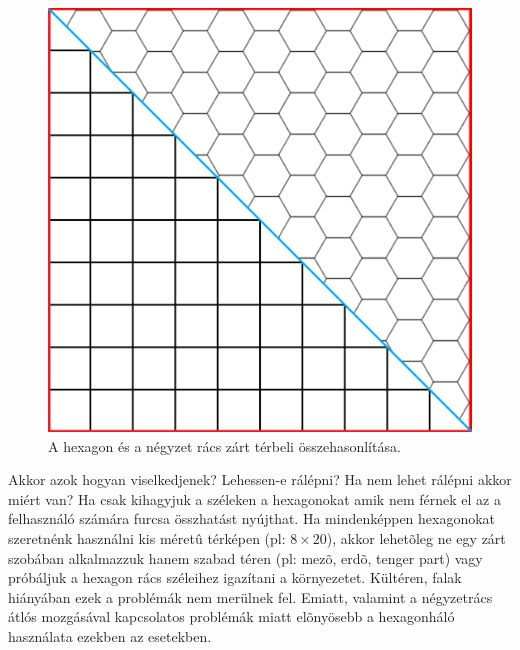 \begin{figure}[h]
\centering
\includegraphics[scale=0.1]{kepek/img24.png}
\caption{A hexagon és a négyzet rács zárt térbeli összehasonlítása.}
\label{fig:img24}
\end{figure}

\noindent Akkor azok hogyan viselkedjenek? 
\newline Lehessen-e rálépni?
\newline Ha nem lehet rálépni akkor miért van?
\newline
\newline Ha csak kihagyjuk a széleken a hexagonokat amik nem férnek el az a felhasználó számára furcsa összhatást nyújthat.
\newline
\newline Ha mindenképpen hexagonokat  szeretnénk használni kis méretû térképen (pl: $8 \times 20$), akkor lehetõleg ne egy zárt szobában alkalmazzuk hanem szabad téren (pl: mezõ, erdõ, tenger part) vagy próbáljuk a hexagon rács széleihez igazítani a környezetet.
\newline
\newline Kültéren, falak hiányában ezek a problémák nem merülnek fel. Emiatt, valamint a négyzetrács átlós mozgásával kapcsolatos problémák miatt elõnyösebb a hexagonháló használata ezekben az esetekben.

